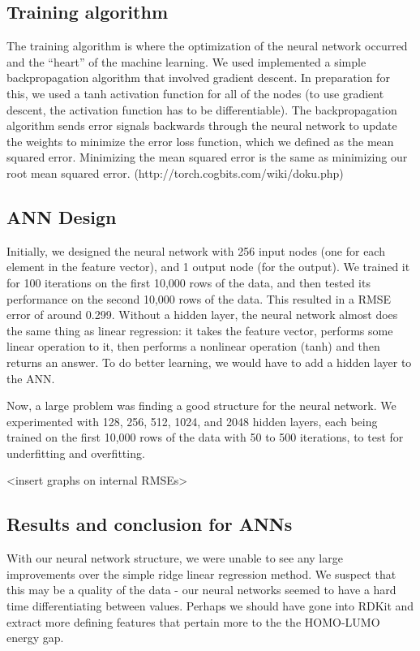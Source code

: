 \documentclass{article}
\begin{document}
\subsection{Training algorithm}
The training algorithm is where the optimization of the neural network
 occurred and the “heart” of the machine learning.  We used implemented 
 a simple backpropagation algorithm that involved gradient descent.  In 
 preparation for this, we used a tanh activation function for all of the
  nodes (to use gradient descent, the activation function has to be differentiable). 
   The backpropagation algorithm sends error signals backwards through the neural
    network to update the weights to minimize the error loss function, which we
     defined as the mean squared error.  Minimizing the mean squared error is
      the same as minimizing our root mean squared error.
(http://torch.cogbits.com/wiki/doku.php)

\subsection{ANN Design}
Initially, we designed the neural network with 256 input nodes
 (one for each element in the feature vector), and 1 output node
  (for the output).  We trained it for 100 iterations on the first 
  10,000 rows of the data, and then tested its performance on the 
  second 10,000 rows of the data.  This resulted in a RMSE error of
   around 0.299.  Without a hidden layer, the neural network almost
    does the same thing as linear regression: it takes the feature
     vector, performs some linear operation to it, then performs a 
     nonlinear operation (tanh) and then returns an answer.  To do better
      learning, we would have to add a hidden layer to the ANN.

Now, a large problem was finding a good structure for the neural network. 
 We experimented with 
128, 256, 512, 1024, and 2048 hidden layers, each being trained on the first
 10,000 rows of the data with 50 to 500 iterations, to test for underfitting and
  overfitting.

<insert graphs on internal RMSEs>

\subsection{Results and conclusion for ANNs}
With our neural network structure, we were unable to see any large 
improvements over the simple ridge linear regression method.  We suspect
 that this may be a quality of the data - our neural networks seemed to 
 have a hard time differentiating between values.  Perhaps we should have gone
  into RDKit and extract more defining features that pertain more to the the 
  HOMO-LUMO energy gap.  
\end{document}
